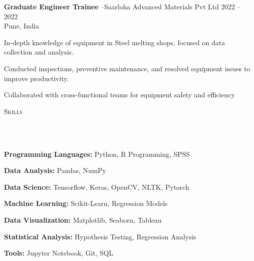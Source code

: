\documentclass{article}
\newcommand{\employer}[4]{{
        \vspace*{2pt}%
        \textbf{#1} #2 \hfill #3\\ #4 \vspace*{2pt}}
        }
\newcommand{\lineunder}{
        \vspace*{-8pt} \\ \hspace*{-18pt} 
        \hrulefill \\
        }
\newcommand{\header}[1]{{
        \hspace*{-15pt}\vspace*{6pt} \textsc{#1}} \vspace*{-6pt} 
        \lineunder
        }
\renewcommand{\labelitemii}{
        $\vcenter{\hbox{\tiny$\bullet$}}$\hspace*{-3pt}
        }
\newenvironment{bullet-list-major}{
          \begin{list}{\labelitemii}{\setlength\leftmargin{3pt} 
          \topsep 0pt \itemsep -2pt}}{\vspace*{4pt}\end{list}
          }
\newenvironment{bullet-list-minor}{
          \begin{list}{\labelitemii}{\setlength\leftmargin{15pt} 
            \topsep 0pt \itemsep -2pt}}{\vspace*{4pt}\end{list}
            }
\begin{document}
      {
      \employer{Graduate Engineer Trainee}{--Saarloha Advanced Materials Pvt Ltd}{2022 -- 2022}{Pune, India}
      \begin{bullet-list-minor}
          \item In-depth knowledge of equipment in Steel melting shops, focused on data collection and analysis.
\item Conducted inspections, preventive maintenance, and resolved equipment issues to improve productivity.
\item Collaborated with cross-functional teams for equipment safety and efficiency
      \end{bullet-list-minor}
  }
      \vspace*{4pt}%
      \header{Skills}
      {
        \begin{bullet-list-major}
        \item \textbf{Programming Languages:} Python, R Programming, SPSS
        \end{bullet-list-major}
        

        \begin{bullet-list-major}
        \item \textbf{Data Analysis:} Pandas, NumPy
        \end{bullet-list-major}
        

        \begin{bullet-list-major}
        \item \textbf{Data Science:} Tensorflow, Keras, OpenCV, NLTK, Pytorch
        \end{bullet-list-major}
        

        \begin{bullet-list-major}
        \item \textbf{Machine Learning:} Scikit-Learn, Regression Models
        \end{bullet-list-major}
        

        \begin{bullet-list-major}
        \item \textbf{Data Visualization:} Matplotlib, Seaborn, Tableau
        \end{bullet-list-major}
        

        \begin{bullet-list-major}
        \item \textbf{Statistical Analysis:} Hypothesis Testing, Regression Analysis
        \end{bullet-list-major}
        

        \begin{bullet-list-major}
        \item \textbf{Tools:} Jupyter Notebook, Git, SQL
        \end{bullet-list-major}
        }
  
\end{document}
